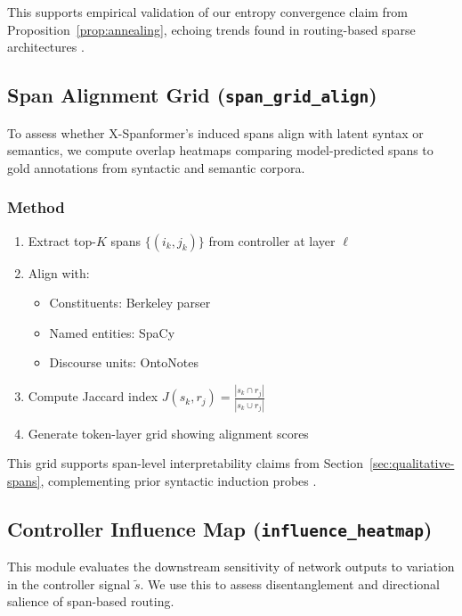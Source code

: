 This supports empirical validation of our entropy convergence claim from Proposition~\ref{prop:annealing}, echoing trends found in routing-based sparse architectures \cite{tay2020sparse, shazeer2017outrageously}.

\subsection{Span Alignment Grid (\texttt{span\_grid\_align})}
\label{sec:vis-align}

To assess whether X-Spanformer’s induced spans align with latent syntax or semantics, we compute overlap heatmaps comparing model-predicted spans to gold annotations from syntactic and semantic corpora.

\subsubsection*{Method}

\begin{enumerate}[leftmargin=1.5em]
  \item Extract top-$K$ spans \( \{(i_k, j_k)\} \) from controller at layer \( \ell \)
  \item Align with:
  \begin{itemize}
    \item Constituents: Berkeley parser \cite{kitaev2018constituency}
    \item Named entities: SpaCy \cite{honnibal2017spacy}
    \item Discourse units: OntoNotes \cite{weischedel2013ontonotes}
  \end{itemize}
  \item Compute Jaccard index \( J(s_k, r_j) = \frac{|s_k \cap r_j|}{|s_k \cup r_j|} \)
  \item Generate token-layer grid showing alignment scores
\end{enumerate}

This grid supports span-level interpretability claims from Section~\ref{sec:qualitative-spans}, complementing prior syntactic induction probes \cite{kim2019unsupervised}.

\subsection{Controller Influence Map (\texttt{influence\_heatmap})}
\label{sec:vis-influence}

This module evaluates the downstream sensitivity of network outputs to variation in the controller signal \( \tilde{s} \). We use this to assess disentanglement and directional salience of span-based routing.

